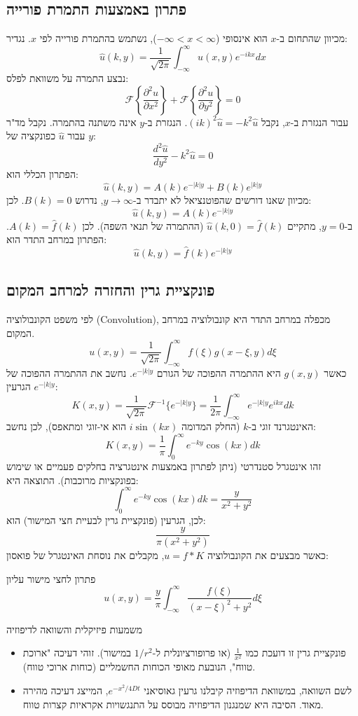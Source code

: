 \subsection{פתרון באמצעות התמרת פורייה}
מכיוון שהתחום ב-$x$ הוא אינסופי ($-\infty < x < \infty$), נשתמש בהתמרת פורייה לפי $x$. נגדיר:
\[ \hat{u}(k,y) = \frac{1}{\sqrt{2\pi}} \int_{-\infty}^{\infty} u(x,y) e^{-ikx} dx \]
נבצע התמרה על משוואת לפלס:
\[ \mathcal{F} \left\{ \frac{\partial^2 u}{\partial x^2} \right\} + \mathcal{F} \left\{ \frac{\partial^2 u}{\partial y^2} \right\} = 0 \]
עבור הנגזרת ב-$x$, נקבל $(ik)^2 \hat{u} = -k^2 \hat{u}$. הנגזרת ב-$y$ אינה משתנה בהתמרה. נקבל מד"ר עבור $\hat{u}$ כפונקציה של $y$:
\[ \frac{d^2 \hat{u}}{dy^2} - k^2 \hat{u} = 0 \]
הפתרון הכללי הוא:
\[ \hat{u}(k,y) = A(k) e^{-|k|y} + B(k) e^{|k|y} \]
מכיוון שאנו דורשים שהפוטנציאל לא יתבדר ב-$y \to \infty$, נדרוש $B(k)=0$. לכן:
\[ \hat{u}(k,y) = A(k) e^{-|k|y} \]
ב-$y=0$, מתקיים $\hat{u}(k,0) = \hat{f}(k)$ (ההתמרה של תנאי השפה). לכן $A(k) = \hat{f}(k)$.
הפתרון במרחב התדר הוא:
\[ \hat{u}(k,y) = \hat{f}(k) e^{-|k|y} \]

\subsection{פונקציית גרין והחזרה למרחב המקום}
לפי משפט הקונבולוציה (Convolution), מכפלה במרחב התדר היא קונבולוציה במרחב המקום.
\[ u(x,y) = \frac{1}{\sqrt{2\pi}} \int_{-\infty}^{\infty} f(\xi) g(x-\xi, y) d\xi \]
כאשר $g(x,y)$ היא ההתמרה ההפוכה של הגורם $e^{-|k|y}$.
נחשב את ההתמרה ההפוכה של הגרעין $e^{-|k|y}$:
\[ K(x,y) = \frac{1}{\sqrt{2\pi}} \mathcal{F}^{-1} \{ e^{-|k|y} \} = \frac{1}{2\pi} \int_{-\infty}^{\infty} e^{-|k|y} e^{ikx} dk \]
האינטגרנד זוגי ב-$k$ (החלק המדומה $i\sin(kx)$ הוא אי-זוגי ומתאפס), לכן נחשב:
\[ K(x,y) = \frac{1}{\pi} \int_{0}^{\infty} e^{-ky} \cos(kx) dk \]
זהו אינטגרל סטנדרטי (ניתן לפתרון באמצעות אינטגרציה בחלקים פעמיים או שימוש בפונקציות מרוכבות). התוצאה היא:
\[ \int_{0}^{\infty} e^{-ky} \cos(kx) dk = \frac{y}{x^2 + y^2} \]
לכן, הגרעין (פונקציית גרין לבעיית חצי המישור) הוא:
\[ \frac{y}{\pi(x^2 + y^2)} \]
כאשר מבצעים את הקונבולוציה $u = f * K$, מקבלים את נוסחת האינטגרל של פואסון:

\begin{resultbox}{פתרון לחצי מישור עליון}
\[ u(x,y) = \frac{y}{\pi} \int_{-\infty}^{\infty} \frac{f(\xi)}{(x-\xi)^2 + y^2} d\xi \]
\end{resultbox}

\begin{notebox}{משמעות פיזיקלית והשוואה לדיפוזיה}
\begin{itemize}
    \item פונקציית גרין זו דועכת כמו $\frac{1}{x^2}$ (או פרופורציונלית ל-$1/r^2$ במישור). זוהי דעיכה "ארוכת טווח", הנובעת מאופי הכוחות החשמליים (כוחות ארוכי טווח).
    \item לשם השוואה, במשוואת הדיפוזיה קיבלנו גרעין גאוסיאני $e^{-x^2/4Dt}$, המייצג דעיכה מהירה מאוד. הסיבה היא שמנגנון הדיפוזיה מבוסס על התנגשויות אקראיות קצרות טווח.
\end{itemize}
\end{notebox}

